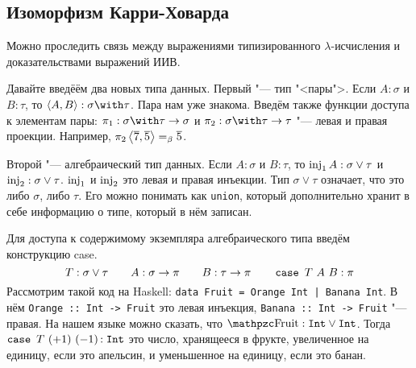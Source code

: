 \subsection{\texorpdfstring{Изоморфизм Карри-Ховарда}{Curry-Howard correspondence}}

Можно проследить связь между выражениями типизированного $\lambda$-исчисления и доказательствами выражений ИИВ.

Давайте введёём два новых типа данных.
Первый "--- тип "<пары">. Если $A : \sigma$ и $B : \tau$, то $\pair{A}{B} : \sigma \with \tau$. Пара нам уже знакома.
Введём также функции доступа к элементам пары: $\pi_1 : \sigma\with\tau\rightarrow\sigma$ и $\pi_2 : \sigma\with\tau\rightarrow\tau$
"--- левая и правая проекции.
Например, $\pi_2 \left<\overline 7,\overline 5\right> =_\beta \overline 5$.

Второй "--- алгебраический тип данных. Если $A : \sigma$ и $B : \tau$, то $\operatorname{inj}_1 A : \sigma \vee \tau$ и $\operatorname{inj}_2 : \sigma \vee \tau$.
$\operatorname{inj}_1$ и $\operatorname{inj}_2$ это левая и правая инъекции.
Тип $\sigma \vee \tau$ означает, что это либо $\sigma$, либо $\tau$.
Его можно понимать как \texttt{union}, который дополнительно хранит в себе информацию о типе, который в нём записан.

Для доступа к содержимому экземпляра алгебраического типа введём конструкцию case.
\[
T : \sigma \vee \tau \qquad A : \sigma \rightarrow \pi \qquad B : \tau \rightarrow \pi \qquad \mathinner{\mathtt{case}}~T~A~B : \pi
\]
Рассмотрим такой код на Haskell: \texttt{data Fruit = Orange Int | Banana Int}.
В нём \texttt{Orange :: Int -> Fruit} это левая инъекция, \texttt{Banana :: Int -> Fruit} "--- правая.
На нашем языке можно сказать, что $\comb{Fruit} : \mathinner{\mathtt{Int}} \vee \mathinner{\mathtt{Int}}$.
Тогда $\mathinner{\mathtt{case}}~T~(+1)~(-1) \mathinner{:} \mathrel{\mathtt{Int}}$ это число, хранящееся в фрукте, увеличенное на единицу, если это апельсин,
и уменьшенное на единицу, если это банан.

